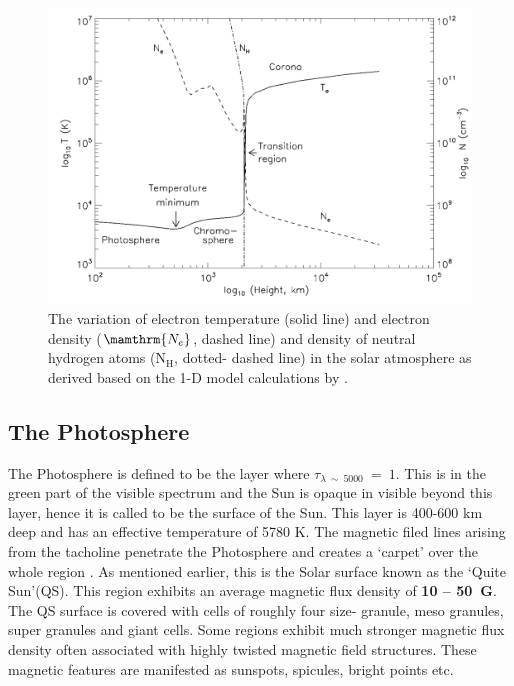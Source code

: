 \begin{figure}[h!]
    \centering
    \includegraphics[width = 0.8\linewidth]{Figures/solar_atm.png}
    \caption{The variation of electron temperature (solid line) and electron density ($\mamthrm{N_{e}}$, dashed line) and density of neutral hydrogen atoms ($\mathrm{N_{H}}$, dotted- dashed line) in the solar atmosphere as derived based on the 1-D model calculations by .}
    \label{fig_solar_atm}
\end{figure}

\subsection{The Photosphere}\label{photosphere}

The Photosphere is defined to be the layer where $\tau_{\lambda~\sim~5000}~=~1$. This is in the green part of the visible spectrum and the Sun is opaque in visible beyond this layer, hence it is called to be the surface of the Sun. This layer is 400-600 km deep and has an effective temperature of 5780 K. The magnetic filed lines arising from the tacholine penetrate the Photosphere and creates a `carpet' over the whole region \citep{priest14}. As mentioned earlier, this is the Solar surface known as the `Quite Sun'(QS). This region exhibits an average magnetic flux density of \textbf{10 -- 50~G}. The QS surface is covered with cells of roughly four size- granule, meso granules, super granules and giant cells. Some regions exhibit much stronger magnetic flux density often associated with highly twisted magnetic field structures. These magnetic features are manifested as sunspots, spicules, bright points etc. 

